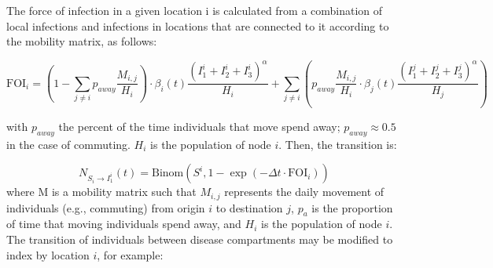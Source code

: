 {The force of infection in a given location i is calculated from a combination of local infections and infections in locations that are connected to it according to the mobility matrix, as follows:
\begin{fullwidth}
\begin{equation}
\text{FOI}_i = \left(1 - \sum_{j\neq i} p_{away} \frac{M_{i,j}}{H_i} \right) \cdot \beta_i(t) \frac{(I_1^{i} + I_2^{i} + I_3^{i})^\alpha}{H_i} +  \sum_{j \neq i} \left(p_{away} \frac{M_{i,j}}{H_i} \cdot \beta_j(t) \frac{(I_1^j + I_2^j + I_3^j)^\alpha}{H_j} \right)
\end{equation}
\end{fullwidth}

with $p_{away}$ the percent of the time individuals that move spend away; $p_{away} \approx 0.5$ in the case of commuting. $H_i$ is the population of node $i$. Then, the transition is:

\begin{equation}
N_{S_i \longrightarrow I_1^{i}}(t) = \text{Binom}(S^i, 1 - \exp(-\Delta t \cdot \text{FOI}_i))
\end{equation}
where M is a mobility matrix such that $M_{i,j}$ represents the daily movement of individuals (e.g., commuting) from origin $i$ to destination $j$, $p_a$ is the proportion of time that moving individuals spend away, and $H_i$ is the population of node $i$. The transition of individuals between disease compartments may be modified to index by location $i$, for example:

}
